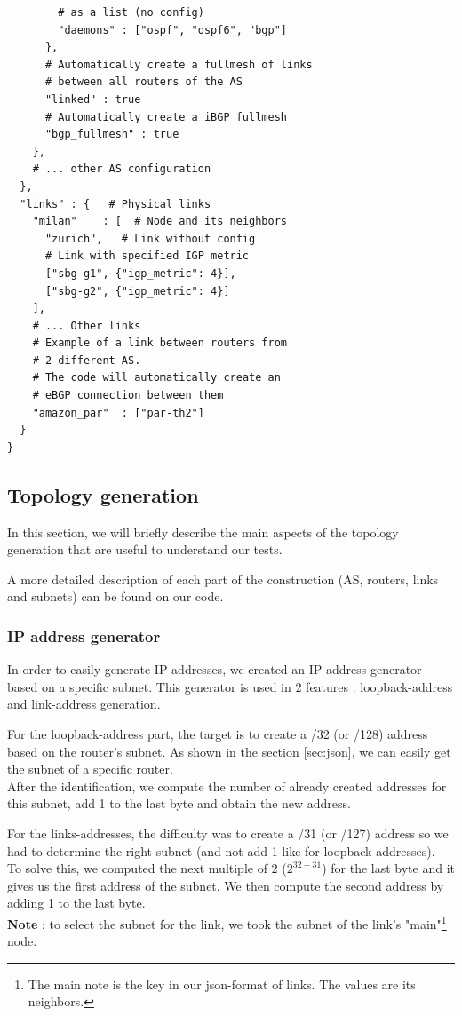 \documentclass[letter, 9pt, conference]{ieeeconf}
\begin{document}
\begin{verbatim}
        # as a list (no config)
        "daemons" : ["ospf", "ospf6", "bgp"]
      },
      # Automatically create a fullmesh of links
      # between all routers of the AS
      "linked" : true
      # Automatically create a iBGP fullmesh
      "bgp_fullmesh" : true
    },
    # ... other AS configuration
  },
  "links" : {   # Physical links
    "milan"    : [  # Node and its neighbors
      "zurich",   # Link without config
      # Link with specified IGP metric
      ["sbg-g1", {"igp_metric": 4}],
      ["sbg-g2", {"igp_metric": 4}]
    ],
    # ... Other links
    # Example of a link between routers from 
    # 2 different AS. 
    # The code will automatically create an 
    # eBGP connection between them
    "amazon_par"  : ["par-th2"]
  }
}

\end{verbatim}


\subsection{Topology generation}

In this section, we will briefly describe the main aspects of the topology generation that are useful to understand our tests. 

A more detailed description of each part of the construction (AS, routers, links and subnets) can be found on our code. 

\subsubsection{IP address generator}

In order to easily generate IP addresses, we created an IP address generator based on a specific subnet. This generator is used in 2 features : loopback-address and link-address generation. 

For the loopback-address part, the target is to create a /32 (or /128) address based on the router's subnet. As shown in the section \ref{sec:json}, we can easily get the subnet of a specific router. \\
After the identification, we compute the number of already created addresses for this subnet, add 1 to the last byte and obtain the new address. 

For the links-addresses, the difficulty was to create a /31 (or /127) address so we had to determine the right subnet (and not add 1 like for loopback addresses). \\
To solve this, we computed the next multiple of 2 ($ 2^{32 - 31} $) for the last byte and it gives us the first address of the subnet. We then compute the second address by adding 1 to the last byte. \\
\textbf{Note} : to select the subnet for the link, we took the subnet of the link's "main"\footnote{The main note is the key in our json-format of links. The values are its neighbors.} node.
\end{document}
